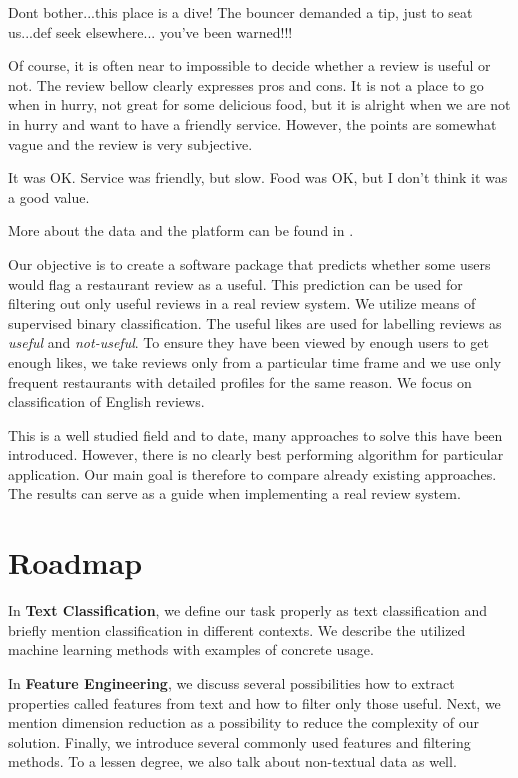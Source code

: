 \begin{code}
Dont bother...this place is a dive!
The bouncer demanded a tip, just to seat us...def seek elsewhere...
you've been warned!!!
\end{code}

Of course, it is often near to impossible to decide whether a review is useful or not.
The review bellow clearly expresses pros and cons.
It is not a place to go when in hurry, not great for some delicious food,
but it is alright when we are not in hurry and want to have a friendly service.
However, the points are somewhat vague and the review is very subjective.

\begin{code}
It was OK. Service was friendly, but slow.
Food was OK, but I don't think it was a good value.
\end{code}


More about the data and the platform can be found in .

Our objective is to create a software package that predicts whether some users would flag a restaurant review as a useful.
This prediction can be used for filtering out only useful reviews in a real review system.
We utilize means of supervised binary classification.
The useful likes are used for labelling reviews as \textit{useful} and \textit{not-useful}.
To ensure they have been viewed by enough users to get enough likes,
we take reviews only from a particular time frame
and we use only frequent restaurants with detailed profiles for the same reason.
We focus on classification of English reviews.

This is a well studied field and to date, many approaches to solve this have been introduced.
However, there is no clearly best performing algorithm for particular application.
Our main goal is therefore to compare already existing approaches.
The results can serve as a guide when implementing a real review system.

\section{Roadmap}

In \textbf{ Text Classification}, we define our task properly as text classification and briefly mention classification in different contexts.
We describe the utilized machine learning methods with examples of concrete usage.

In \textbf{ Feature Engineering}, we discuss several possibilities how to extract properties called features from text and how to filter only those useful.
Next, we mention dimension reduction as a possibility to reduce the complexity of our solution.
Finally, we introduce several commonly used features and filtering methods.
To a lessen degree, we also talk about non-textual data as well.

